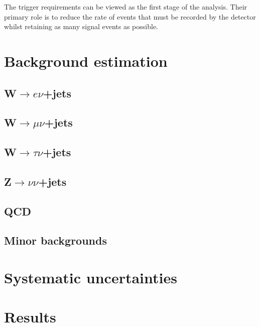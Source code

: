 The trigger requirements can be viewed as the first stage of the analysis. Their primary role is to reduce the rate of events that must be recorded by the detector whilst retaining as many signal events as possible. %


\section{Background estimation}%
\label{sec:promptbkg}

\subsection{W$\rightarrow e\nu$+jets}%
\label{sec:promptwenu}

\subsection{W$\rightarrow \mu\nu$+jets}%
\label{sec:promptwmunu}

\subsection{W$\rightarrow \tau\nu$+jets}%
\label{sec:promptwtaunu}

\subsection{Z$\rightarrow \nu\nu$+jets}%
\label{sec:promptznunu}

\subsection{QCD}%
\label{sec:promptQCD}

\subsection{Minor backgrounds}%
\label{sec:promptminor}

\section{Systematic uncertainties}%
\label{sec:promptsyst}

\section{Results}%
\label{sec:promptresults}
